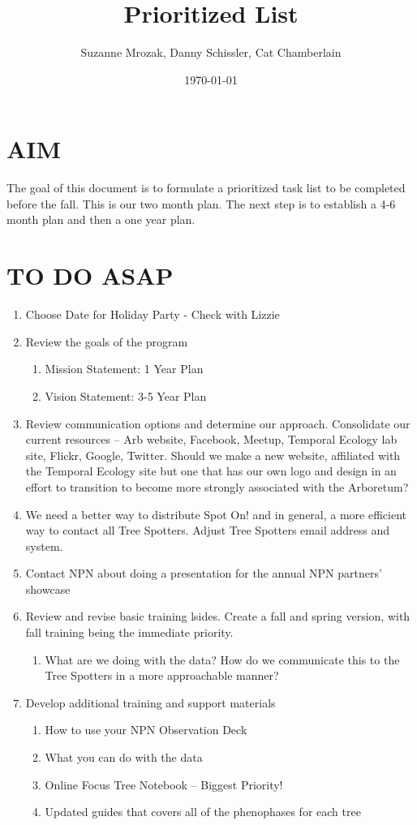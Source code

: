 \documentclass{article}\usepackage[]{graphicx}\usepackage[]{color}
\begin{document}
\renewcommand{\thetable}{\arabic{table}}
\renewcommand{\thefigure}{\arabic{figure}}
\renewcommand{\labelitemi}{$-$}
\title{Prioritized List}
\author{Suzanne Mrozak, Danny Schissler, Cat Chamberlain}
\date{\today}
\maketitle
\section*{AIM}
The goal of this document is to formulate a prioritized task list to be completed before the fall. This is our two month plan. The next step is to establish a 4-6 month plan and then a one year plan. 
\section*{TO DO ASAP}
\begin{enumerate}
\item Choose Date for Holiday Party - Check with Lizzie
\item Review the goals of the program
\begin{enumerate}
  \item Mission Statement: 1 Year Plan
  \item Vision Statement: 3-5 Year Plan
\end{enumerate}
\item Review communication options and determine our approach. Consolidate our current resources -- Arb website, Facebook, Meetup, Temporal Ecology lab site, Flickr, Google, Twitter. Should we make a new website, affiliated with the Temporal Ecology site but one that has our own logo and design in an effort to transition to become more strongly associated with the Arboretum?
\item We need a better way to distribute Spot On! and in general, a more efficient way to contact all Tree Spotters. Adjust Tree Spotters email address and system. 
\item Contact NPN about doing a presentation for the annual NPN partners' showcase
\item Review and revise basic training lsides. Create a fall and spring version, with fall training being the immediate priority. 
\begin{enumerate}
  \item What are we doing with the data? How do we communicate this to the Tree Spotters in a more approachable manner?
\end{enumerate}
\item Develop additional training and support materials
\begin{enumerate}
  \item How to use your NPN Observation Deck
  \item What you can do with the data
  \item Online Focus Tree Notebook -- Biggest Priority! 
  \item Updated guides that covers all of the phenophases for each tree 
\end{enumerate}
\end{enumerate}
\end{document}
